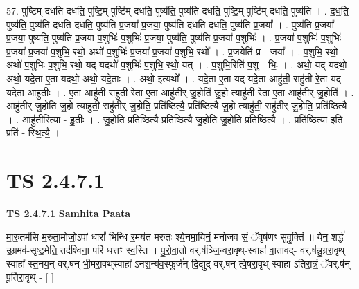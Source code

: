\documentclass[17pt]{extarticle}
\begin{document}
57. पुष्टि॑म् दधति दधति॒ पुष्टि॒म् पुष्टि॑म् दधति॒ पुष्य॑ति॒ पुष्य॑ति दधति॒ पुष्टि॒म् पुष्टि॑म् दधति॒ पुष्य॑ति । . द॒ध॒ति॒ पुष्य॑ति॒ पुष्य॑ति दधति दधति॒ पुष्य॑ति प्र॒जया᳚ प्र॒जया॒ पुष्य॑ति दधति दधति॒ पुष्य॑ति प्र॒जया᳚ । . पुष्य॑ति प्र॒जया᳚ प्र॒जया॒ पुष्य॑ति॒ पुष्य॑ति प्र॒जया॑ प॒शुभिः॑ प॒शुभिः॑ प्र॒जया॒ पुष्य॑ति॒ पुष्य॑ति प्र॒जया॑ प॒शुभिः॑ । . प्र॒जया॑ प॒शुभिः॑ प॒शुभिः॑ प्र॒जया᳚ प्र॒जया॑ प॒शुभि॒ रथो॒ अथो॑ प॒शुभिः॑ प्र॒जया᳚ प्र॒जया॑ प॒शुभि॒ रथो᳚ । . प्र॒जयेति॑ प्र - जया᳚ । . प॒शुभि॒ रथो॒ अथो॑ प॒शुभिः॑ प॒शुभि॒ रथो॒ यद् यदथो॑ प॒शुभिः॑ प॒शुभि॒ रथो॒ यत् । . प॒शुभि॒रिति॑ प॒शु - भिः॒ । . अथो॒ यद् यदथो॒ अथो॒ यदे॒ता ए॒ता यदथो॒ अथो॒ यदे॒ताः । . अथो॒ इत्यथो᳚ । . यदे॒ता ए॒ता यद् यदे॒ता आहु॑ती॒ राहु॑ती रे॒ता यद् यदे॒ता आहु॑तीः । . ए॒ता आहु॑ती॒ राहु॑ती रे॒ता ए॒ता आहु॑तीर् जु॒होति॑ जु॒हो त्याहु॑ती रे॒ता ए॒ता आहु॑तीर् जु॒होति॑ । . आहु॑तीर् जु॒होति॑ जु॒हो त्याहु॑ती॒ राहु॑तीर् जु॒होति॒ प्रति॑ष्ठित्यै॒ प्रति॑ष्ठित्यै जु॒हो त्याहु॑ती॒ राहु॑तीर् जु॒होति॒ प्रति॑ष्ठित्यै । . आहु॑ती॒रित्या - हु॒तीः॒ । . जु॒होति॒ प्रति॑ष्ठित्यै॒ प्रति॑ष्ठित्यै जु॒होति॑ जु॒होति॒ प्रति॑ष्ठित्यै । . प्रति॑ष्ठित्या॒ इति॒ प्रति॑ - स्थि॒त्यै॒ । \newline
\pagebreak
{}

\section{ TS 2.4.7.1 }

\textbf{TS 2.4.7.1 } \newline
\textbf{Samhita Paata} \newline

मा॒रु॒तम॑सि म॒रुता॒मोजो॒ऽपां धारां᳚ भिन्धि र॒मय॑त मरुतः श्ये॒नमा॒यिनं॒ मनो॑जव सं॒ ॅवृष॑णꣳ सुवृ॒क्तिं ॥ येन॒ शर्द्ध॑ उ॒ग्रमव॑-सृष्ट॒मेति॒ तद॑श्विना॒ परि॑ धत्तꣳ स्व॒स्ति । पु॒रो॒वा॒तो वर्.ष॑ञ्जि॒न्वरा॒वृथ्-स्वाहा॑ वा॒तावद्- वर्.ष॑न्नु॒ग्ररा॒वृथ् स्वाहा᳚ स्त॒नय॒न् वर्.ष॑न् भी॒मरा॒वथ्‌स्वाहा॑ ऽनश॒न्य॑व॒स्फूर्ज॑न्-दि॒द्युद्-वर्.ष॑न्-त्वे॒षरा॒वृथ् स्वाहा॑ ऽतिरा॒त्रं॒ ॅवर्.ष॑न् पू॒र्तिरा॒वृथ् - [  ] \newline
\end{document}
